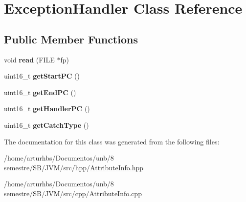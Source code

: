 \hypertarget{classExceptionHandler}{}\section{Exception\+Handler Class Reference}
\label{classExceptionHandler}
\subsection*{Public Member Functions}
\begin{DoxyCompactItemize}
\item 
void {\bfseries read} (F\+I\+LE $\ast$fp)\hypertarget{classExceptionHandler_a9136c36e6dda68b55ad760623a4af5fc}{}\label{classExceptionHandler_a9136c36e6dda68b55ad760623a4af5fc}

\item 
uint16\+\_\+t {\bfseries get\+Start\+PC} ()\hypertarget{classExceptionHandler_a25e0e210e6638a16f2d2ae43cb9e63b2}{}\label{classExceptionHandler_a25e0e210e6638a16f2d2ae43cb9e63b2}

\item 
uint16\+\_\+t {\bfseries get\+End\+PC} ()\hypertarget{classExceptionHandler_abb77266bac3ca92769525b3a19ce07cd}{}\label{classExceptionHandler_abb77266bac3ca92769525b3a19ce07cd}

\item 
uint16\+\_\+t {\bfseries get\+Handler\+PC} ()\hypertarget{classExceptionHandler_a5288882b315614cd18ff3935d3b7deb7}{}\label{classExceptionHandler_a5288882b315614cd18ff3935d3b7deb7}

\item 
uint16\+\_\+t {\bfseries get\+Catch\+Type} ()\hypertarget{classExceptionHandler_a841a52c00770c5967c578918d3dfbde8}{}\label{classExceptionHandler_a841a52c00770c5967c578918d3dfbde8}

\end{DoxyCompactItemize}


The documentation for this class was generated from the following files\+:\begin{DoxyCompactItemize}
\item 
/home/arturhbs/\+Documentos/unb/8 semestre/\+S\+B/\+J\+V\+M/src/hpp/\hyperlink{AttributeInfo_8hpp}{Attribute\+Info.\+hpp}\item 
/home/arturhbs/\+Documentos/unb/8 semestre/\+S\+B/\+J\+V\+M/src/cpp/Attribute\+Info.\+cpp\end{DoxyCompactItemize}
